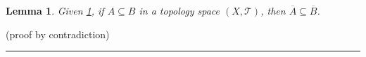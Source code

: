 \documentclass[12pt]{article}
\numberwithin{equation}{section}
\theoremstyle{plain} %
\newtheorem{lemma}[equation]{Lemma}
\theoremstyle{definition}
\theoremstyle{remark}
\newenvironment{proof}{{\bf Proof:}}{\hfill\rule{2mm}{2mm}}
\begin{document}
\begin{lemma}
Given \hyperref[definition:closure 1]{1}, if $A \subseteq B$ in a topology space $(X, \mathcal{T})$, then $\overline{A} \subseteq \overline{B}$. \label{lemma:topological closure of subset is subset of topological closure} \label{lemma:topological closure of subset is subset of topological closure}
\end{lemma}

\begin{proof}
(proof by contradiction)
\end{proof}

%


%  	
%
%

%

\end{document}
